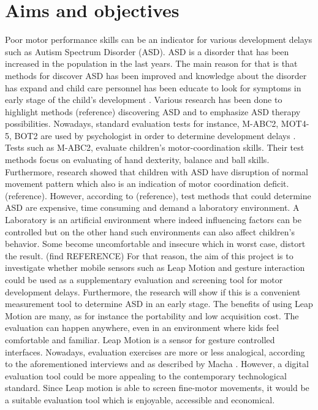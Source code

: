 \chapter{Aims and objectives}
\label{chap:aim}

Poor motor performance skills can be an indicator for various development delays such as Autism Spectrum Disorder (ASD).
ASD is a disorder that has been increased in the population in the last years. The main reason for that is that methods for discover ASD has been improved and knowledge about the disorder has expand and child care personnel has been educate to look for symptoms in early stage of the child's development  \cite{Folkehelseinstituttet2015}. %
Various research has been done to highlight methods (reference) discovering ASD and to emphasize ASD therapy possibilities. Nowadays, standard evaluation tests for instance, M-ABC2, MOT4-5, BOT2 are used by psychologist in order to determine development delays \cite{Macha2010}.
Tests such as M-ABC2, evaluate children's motor-coordination skills. Their test methods focus on evaluating of hand dexterity, balance and ball skills. Furthermore, research showed that children with ASD have disruption of normal movement pattern which also is an indication of motor coordination deficit.(reference). However, according to (reference), test methods that could determine ASD are expensive, time consuming and demand a laboratory environment. A Laboratory is an artificial environment where indeed influencing factors can be controlled but on the other hand such environments can also affect children's behavior. Some become uncomfortable and insecure which in worst case, distort the result. (find REFERENCE) For that reason, the aim of this project is to investigate whether mobile sensors such as Leap Motion and gesture interaction could be used as a supplementary evaluation and screening tool for motor development delays. Furthermore, the research will show if this is a convenient measurement tool to determine ASD in an early stage. The benefits of using Leap Motion are many, as for instance the portability and low acquisition cost. The evaluation can happen anywhere, even in an environment where kids feel comfortable and familiar. Leap Motion is a sensor for gesture controlled interfaces. Nowadays, evaluation exercises are more or less analogical, according to the aforementioned interviews and as described by Macha \cite{Macha2010}. %
However, a digital evaluation tool could be more appealing to the contemporary technological standard. Since Leap motion is able to screen fine-motor movements, it would be a suitable evaluation tool which is enjoyable, accessible and economical.

